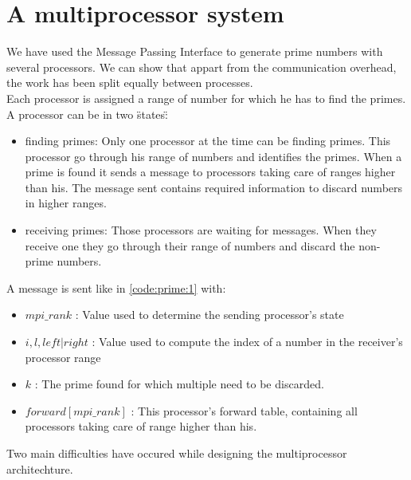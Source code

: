 \newpage\cleardoublepage{}
\section{A multiprocessor system}


We have used the Message Passing Interface to generate prime numbers with several processors. We can show that appart from the communication overhead, the work has been split equally between processes. \\ Each processor is assigned a range of number for which he has to find the primes. A processor can be in two \"states\":
\begin{itemize}
	\item{finding primes: }
	Only one processor at the time can be finding primes. This processor go through his range of numbers and identifies the primes. When a prime is found it sends a message to processors taking care of ranges higher than his. The message sent contains required information to discard numbers in higher ranges. 
	\item{receiving primes: }
	Those processors are waiting for messages. When they receive one they go through their range of numbers and discard the non-prime numbers. 

\end{itemize}


A message is sent like in \ref{code:prime:1} with:

\begin{itemize}
	\item{$mpi\_rank$ :}
	Value used to determine the sending processor's state
	
	\item{$i,l, left|right$ :}
	Value used to compute the index of a number in the receiver's processor range
	\item{$k$ :} 
	The prime found for which multiple need to be discarded.
	\item{$forward[mpi\_rank]$ :}
	This processor's forward table, containing all processors taking care of range higher than his.

\end{itemize}


Two main difficulties have occured while designing the multiprocessor architechture.
